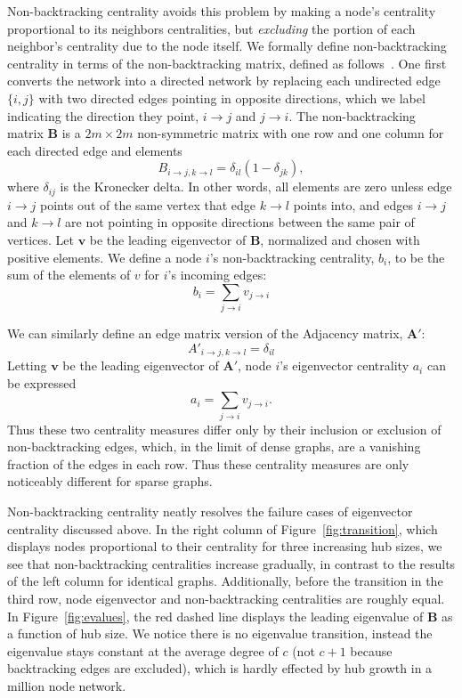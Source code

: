 \documentclass[twocolumn,prl,superscriptaddress]{revtex4}
\newcommand{\mat}{\mathbf}
\renewcommand{\vec}{\mathbf}
\begin{document}
Non-backtracking centrality avoids this problem by making a node's centrality proportional to its neighbors centralities, but \emph{excluding} the portion of each neighbor's centrality due to the node itself. We formally define non-backtracking centrality in terms of the non-backtracking matrix, defined as follows~\cite{newman13}. One first converts the network into a directed network by replacing each undirected edge $\{i, j\}$ with two directed edges pointing in opposite directions, which we label indicating the direction they point, $i \rightarrow j$ and $j \rightarrow i$. The non-backtracking matrix $\mat{B}$ is a $2m \times 2m$ non-symmetric matrix with one row and one column for each directed edge and elements
\begin{equation}
B_{i\rightarrow j, k \rightarrow l} = \delta_{il}(1-\delta_{jk}),
\end{equation}
where $\delta_{ij}$ is the Kronecker delta. In other words, all elements are zero unless edge $i\rightarrow j$ points out of the same vertex that edge $k \rightarrow l$ points into, and edges $i \rightarrow j$ and $k \rightarrow l$ are not pointing in opposite directions between the same pair of vertices. Let $\vec{v}$ be the leading eigenvector of $\mat{B}$, normalized and chosen with positive elements. We define a node $i$'s non-backtracking centrality, $b_i$, to be the sum of the elements of $v$ for $i$'s incoming edges:
\begin{equation*}
b_i = \sum_{j\rightarrow i} v_{j\rightarrow i}
\end{equation*}

We can similarly define an edge matrix version of the Adjacency matrix, $\mat{A'}$:
\begin{equation*}
A'_{i\rightarrow j, k \rightarrow l} = \delta_{il}
\end{equation*}
Letting $\vec{v}$ be the leading eigenvector of $\mat{A'}$, node $i$'s eigenvector centrality $a_i$ can be expressed
\begin{equation}
a_i = \sum_{j\rightarrow i} v_{j\rightarrow i}.
\end{equation}
Thus these two centrality measures differ only by their inclusion or exclusion of non-backtracking edges, which, in the limit of dense graphs, are a vanishing fraction of the edges in each row. Thus these centrality measures are only noticeably different for sparse graphs.

Non-backtracking centrality neatly resolves the failure cases of eigenvector centrality discussed above. In the right column of Figure~\ref{fig:transition}, which displays nodes proportional to their centrality for three increasing hub sizes, we see that non-backtracking centralities increase gradually, in contrast to the results of the left column for identical graphs. Additionally, before the transition in the third row, node eigenvector and non-backtracking centralities are roughly equal. In Figure~\ref{fig:evalues}, the red dashed line displays the leading eigenvalue of $\mat{B}$ as a function of hub size. We notice there is no eigenvalue transition, instead the eigenvalue stays constant at the average degree of $c$ (not $c+1$ because backtracking edges are excluded), which is hardly effected by hub growth in a million node network.
\end{document}

